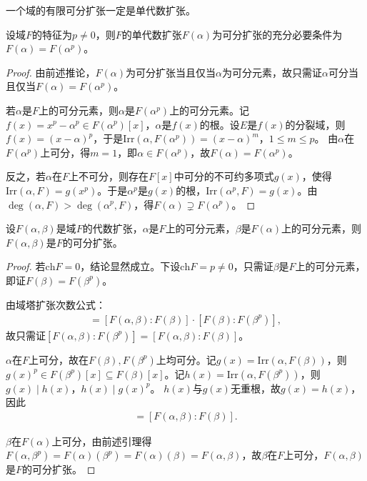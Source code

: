 \documentclass[../../main.tex]{subfiles}%
\begin{document}
\begin{corollary}
一个域的有限可分扩张一定是单代数扩张。
\end{corollary}

\begin{lemma}
设域$F$的特征为$p\neq0$，则$F$的单代数扩张$F(\alpha)$为可分扩张的充分必要条件为$F(\alpha)=F(\alpha^p)$。
\end{lemma}
\begin{proof}

由前述推论，$F(\alpha)$为可分扩张当且仅当$\alpha$为可分元素，故只需证$\alpha$可分当且仅当$F(\alpha)=F(\alpha^p)$。

若$\alpha$是$F$上的可分元素，则$\alpha$是$F(\alpha^p)$上的可分元素。记$f(x)=x^p-\alpha^p\in F(\alpha^p)[x]$，$\alpha$是$f(x)$的根。设$E$是$f(x)$的分裂域，则$f(x)=(x-\alpha)^p$，于是$\mathrm{Irr}(\alpha,F(\alpha^p))=(x-\alpha)^m$，$1\leqslant m\leqslant p$。
由$\alpha$在$F(\alpha^p)$上可分，得$m=1$，即$\alpha\in F(\alpha^p)$，故$F(\alpha)=F(\alpha^p)$。

反之，若$\alpha$在$F$上不可分，则存在$F[x]$中可分的不可约多项式$g(x)$，使得$\mathrm{Irr}(\alpha,F)=g(x^p)$。于是$\alpha^p$是$g(x)$的根，$\mathrm{Irr}(\alpha^p,F)=g(x)$。由$\deg(\alpha,F)>\deg(\alpha^p,F)$，得$F(\alpha)\supsetneq F(\alpha^p)$。

\end{proof}

\begin{lemma}
设$F(\alpha,\beta)$是域$F$的代数扩张，$\alpha$是$F$上的可分元素，$\beta$是$F(\alpha)$上的可分元素，则$F(\alpha,\beta)$是$F$的可分扩张。
\end{lemma}
\begin{proof}

若$\mathrm{ch}F=0$，结论显然成立。下设$\mathrm{ch}F=p\neq0$，只需证$\beta$是$F$上的可分元素，即证$F(\beta)=F(\beta^p)$。

由域塔扩张次数公式：
\begin{align*}
[F(\alpha,\beta):F(\beta^p)]=[F(\alpha,\beta):F(\beta)]\cdot[F(\beta):F(\beta^p)],
\end{align*}
故只需证$[F(\alpha,\beta):F(\beta^p)]=[F(\alpha,\beta):F(\beta)]$。

$\alpha$在$F$上可分，故在$F(\beta),F(\beta^p)$上均可分。记$g(x)=\mathrm{Irr}(\alpha,F(\beta))$，则$g(x)^p\in F(\beta^p)[x]\subseteq F(\beta)[x]$。记$h(x)=\mathrm{Irr}(\alpha,F(\beta^p))$，则$g(x)\mid h(x)$，$h(x)\mid g(x)^p$。
$h(x)$与$g(x)$无重根，故$g(x)=h(x)$，因此
\begin{align*}
[F(\alpha,\beta^p):F(\beta^p)]=[F(\alpha,\beta):F(\beta)].
\end{align*}

$\beta$在$F(\alpha)$上可分，由前述引理得$F(\alpha,\beta^p)=F(\alpha)(\beta^p)=F(\alpha)(\beta)=F(\alpha,\beta)$，故$\beta$在$F$上可分，$F(\alpha,\beta)$是$F$的可分扩张。

\end{proof}
\end{document}
